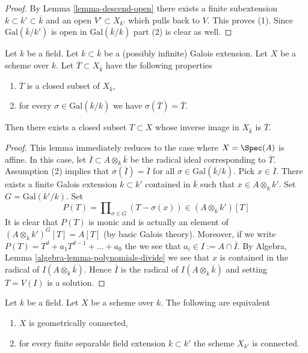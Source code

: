 \begin{proof}
By Lemma \ref{lemma-descend-open} there exists a finite subextension
$k \subset k' \subset \overline{k}$ and an open $V' \subset X_{k'}$
which pulls back to $V$. This proves (1). Since $\text{Gal}(\overline{k}/k')$
is open in $\text{Gal}(\overline{k}/k)$ part (2) is clear as well.
\end{proof}

\begin{lemma}
\label{lemma-closed-fixed-by-Galois}
Let $k$ be a field. Let $k \subset \overline{k}$ be a (possibly infinite)
Galois extension. Let $X$ be a scheme over $k$. Let
$\overline{T} \subset X_{\overline{k}}$ have the following properties
\begin{enumerate}
\item $\overline{T}$ is a closed subset of $X_{\overline{k}}$,
\item for every $\sigma \in \text{Gal}(\overline{k}/k)$
we have $\sigma(\overline{T}) = \overline{T}$.
\end{enumerate}
Then there exists a closed subset $T \subset X$ whose inverse image
in $X_{\overline{k}}$ is $\overline{T}$.
\end{lemma}

\begin{proof}
This lemma immediately reduces to the case where $X = \Spec(A)$
is affine. In this case, let $\overline{I} \subset A \otimes_k \overline{k}$
be the radical ideal corresponding to $\overline{T}$.
Assumption (2) implies that $\sigma(\overline{I}) = \overline{I}$
for all $\sigma \in \text{Gal}(\overline{k}/k)$.
Pick $x \in \overline{I}$. There exists a finite Galois extension
$k \subset k'$ contained in $\overline{k}$ such that $x \in A \otimes_k k'$.
Set $G = \text{Gal}(k'/k)$. Set
$$
P(T) = \prod\nolimits_{\sigma \in G} (T - \sigma(x)) \in (A \otimes_k k')[T]
$$
It is clear that $P(T)$ is monic and is actually an element of
$(A \otimes_k k')^G[T] = A[T]$ (by basic Galois theory).
Moreover, if we write $P(T) = T^d + a_1T^{d - 1} + \ldots + a_0$
the we see that $a_i \in I := A \cap \overline{I}$. By
Algebra, Lemma \ref{algebra-lemma-polynomials-divide}
we see that $x$ is contained in the radical of $I(A \otimes_k \overline{k})$.
Hence $\overline{I}$ is the radical of $I(A \otimes_k \overline{k})$ and
setting $T = V(I)$ is a solution.
\end{proof}

\begin{lemma}
\label{lemma-characterize-geometrically-disconnected}
Let $k$ be a field.
Let $X$ be a scheme over $k$.
The following are equivalent
\begin{enumerate}
\item $X$ is geometrically connected,
\item for every finite separable field extension $k \subset k'$
the scheme $X_{k'}$ is connected.
\end{enumerate}
\end{lemma}

